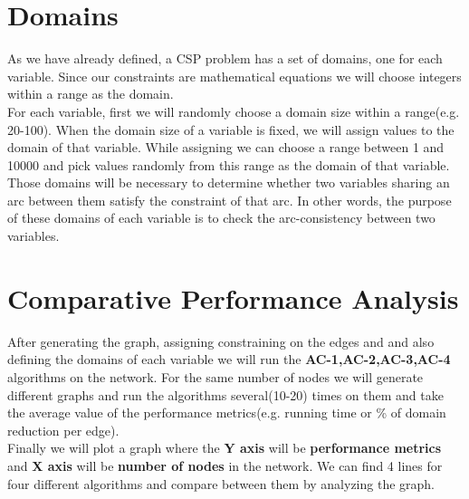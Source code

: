 \documentclass[conference]{IEEEtran}
\begin{document}
\section{Domains}\noindent
As we have already defined, a CSP problem has a set of domains, one for each variable. Since our constraints are mathematical equations we will choose integers within a range as the domain.
\\For each variable, first we will randomly choose a domain size within a range(e.g. 20-100). When the domain size of a variable is fixed, we will assign values to the domain of that variable. While assigning we can choose a range between 1 and 10000 and pick values randomly from this range as the domain of that variable.
\\Those domains will be necessary to determine whether two variables sharing an arc between them satisfy the constraint of that arc. In other words, the purpose of these domains of each variable is to check the arc-consistency between two variables.
\section{Comparative Performance Analysis}
\noindent After generating the graph, assigning constraining on the edges and and also defining the domains of each variable we will run the \textbf{AC-1,AC-2,AC-3,AC-4} algorithms on the network. For the same number of nodes we will generate different graphs and run the algorithms several(10-20) times on them and take the average value of the performance metrics(e.g. running time or \% of domain reduction per edge).\\
\noindent Finally we will plot a graph where the \textbf{Y axis} will be \textbf{performance metrics} and \textbf{X axis} will be \textbf{number of nodes} in the network. We can find 4 lines for four different algorithms and compare between them by analyzing the graph.
\end{document}
